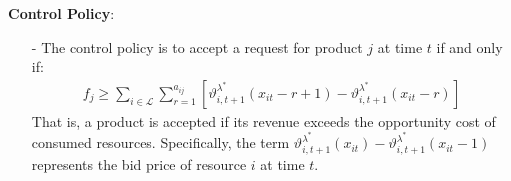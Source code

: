 \documentclass[11pt]{article}
\begin{document}
\vspace{0.5cm}

\noindent
\textbf{Control Policy}:
\begin{itemize}
\item[-] The control policy is to accept a request for product $j$ at time $t$ if and only if:
    \begin{align*}
        f_j \geq \sum_{i \in \mathcal{L}} \sum_{r = 1}^{a_{ij}} \left[ \vartheta^{\lambda^{*}}_{i,t+1}(x_{it} - r + 1) - \vartheta^{\lambda^{*}}_{i,t+1}(x_{it} - r) \right]
    \end{align*}
    That is, a product is accepted if its revenue exceeds the opportunity cost of consumed resources. 
    Specifically, the term $\vartheta^{\lambda^{*}}_{i,t+1}(x_{it}) - \vartheta^{\lambda^{*}}_{i,t+1}(x_{it} - 1)$ represents the bid price of resource $i$ at time $t$.
\end{itemize}

\vspace{0.5cm}



\end{document}
